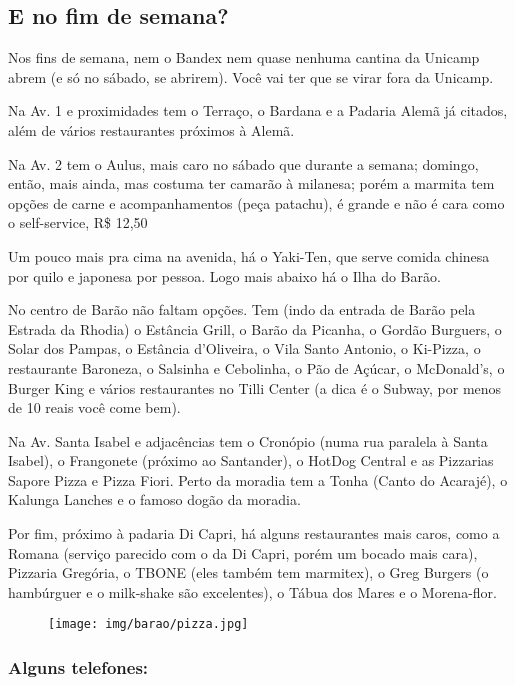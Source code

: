 \subsection{E no fim de semana?}

Nos fins de semana, nem o Bandex nem quase nenhuma cantina da Unicamp abrem (e
só no sábado, se abrirem). Você vai ter que se virar fora da Unicamp.

Na Av. 1 e proximidades tem o Terraço, o Bardana e a Padaria Alemã já citados,
além de vários restaurantes próximos à Alemã.

Na Av. 2 tem o Aulus, mais caro no sábado que durante a semana; domingo, então,
mais ainda, mas costuma ter camarão à milanesa; porém a marmita tem opções de
carne e acompanhamentos (peça patachu), é grande e não é cara como o
self-service, R\$ 12,50

Um pouco mais pra cima na avenida, há o Yaki-Ten, que serve comida chinesa por quilo e
japonesa por pessoa.  Logo mais abaixo há o Ilha do Barão.

No centro de Barão não faltam opções. Tem (indo da entrada de Barão pela Estrada
da Rhodia) o Estância Grill, o Barão da Picanha, o Gordão Burguers, o Solar dos
Pampas, o Estância d'Oliveira, o Vila Santo Antonio, o Ki-Pizza, o restaurante
Baroneza, o Salsinha e Cebolinha, o Pão de Açúcar, o McDonald's, o Burger King e
vários restaurantes no Tilli Center (a dica é o Subway, por menos de 10 reais
você come bem).

Na Av.  Santa Isabel e adjacências tem o Cronópio (numa rua paralela à Santa
Isabel), o Frangonete (próximo ao Santander), o HotDog Central e as Pizzarias
Sapore Pizza e Pizza Fiori. Perto da moradia tem a Tonha (Canto do Acarajé), o
Kalunga Lanches e o famoso dogão da moradia.

Por fim, próximo à padaria Di Capri, há alguns restaurantes mais caros, como a
Romana (serviço parecido com o da Di Capri, porém um bocado mais cara), Pizzaria
Gregória, o TBONE (eles também tem marmitex), o Greg Burgers (o hambúrguer e o
milk-shake são excelentes), o Tábua dos Mares e o Morena-flor.

\begin{figure}[h!]
    \centering
    \texttt{[image: img/barao/pizza.jpg]}
\end{figure}

\subsubsection*{Alguns telefones:}

